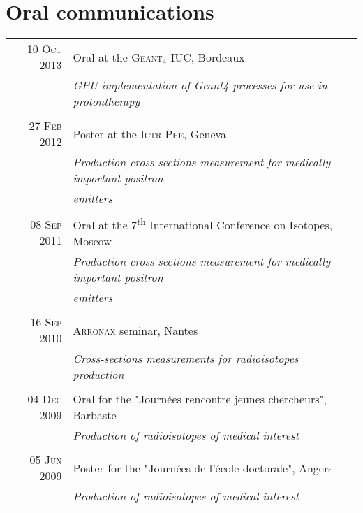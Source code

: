 \documentclass[a4paper,10pt]{article}
\begin{document}
\section{Oral communications}
\begin{tabular}{r|l}
 \textsc{10 Oct 2013} & Oral at the \textsc{Geant}$_4$ IUC, Bordeaux\\
 &\emph{GPU implementation of Geant4 processes for use in protontherapy}\\
 \multicolumn{2}{c}{}\\
 \textsc{27 Feb 2012} & Poster at the \textsc{Ictr-Phe}, Geneva\\
 &\emph{Production cross-sections measurement for medically important positron}\\
 &\emph{emitters}\\
 \multicolumn{2}{c}{}\\
 \textsc{08 Sep 2011} & Oral at the 7\textsuperscript{th} International Conference on Isotopes, Moscow\\
 &\emph{Production cross-sections measurement for medically important positron}\\
 &\emph{emitters}\\
 \multicolumn{2}{c}{}\\
 \textsc{16 Sep 2010} & \textsc{Arronax} seminar, Nantes\\
 &\emph{Cross-sections measurements for radioisotopes production}\\
 \multicolumn{2}{c}{}\\
 \textsc{04 Dec 2009} & Oral for the "Journées rencontre jeunes chercheurs", Barbaste\\
 &\emph{Production of radioisotopes of medical interest}\\
 \multicolumn{2}{c}{}\\
 \textsc{05 Jun 2009} & Poster for the "Journées de l'école doctorale", Angers\\
 &\emph{Production of radioisotopes of medical interest}\\
\end{tabular}
\end{document}

